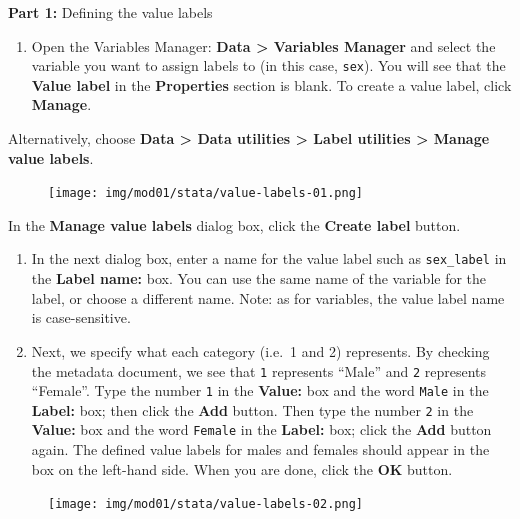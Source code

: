 \documentclass[
  a4paper,
]{memoir}
\providecommand{\tightlist}{%
  \setlength{\itemsep}{0pt}\setlength{\parskip}{0pt}}\usepackage{longtable,booktabs,array}
\begin{document}
\textbf{Part 1:} Defining the value labels

\begin{enumerate}
\def\labelenumi{\arabic{enumi}.}
\tightlist
\item
  Open the Variables Manager: \textbf{Data \textgreater{} Variables
  Manager} and select the variable you want to assign labels to (in this
  case, \texttt{sex}). You will see that the \textbf{Value label} in the
  \textbf{Properties} section is blank. To create a value label, click
  \textbf{Manage}.
\end{enumerate}

Alternatively, choose \textbf{Data \textgreater{} Data utilities
\textgreater{} Label utilities \textgreater{} Manage value labels}.

\begin{figure}[H]

{\centering \texttt{[image: img/mod01/stata/value-labels-01.png]}

}

\end{figure}

In the \textbf{Manage value labels} dialog box, click the \textbf{Create
label} button.

\begin{enumerate}
\def\labelenumi{\arabic{enumi}.}
\setcounter{enumi}{1}
\item
  In the next dialog box, enter a name for the value label such as
  \texttt{sex\_label} in the \textbf{Label name:} box. You can use the
  same name of the variable for the label, or choose a different name.
  Note: as for variables, the value label name is case-sensitive.
\item
  Next, we specify what each category (i.e.~1 and 2) represents. By
  checking the metadata document, we see that \texttt{1} represents
  ``Male'' and \texttt{2} represents ``Female''. Type the number
  \texttt{1} in the \textbf{Value:} box and the word \texttt{Male} in
  the \textbf{Label:} box; then click the \textbf{Add} button. Then type
  the number \texttt{2} in the \textbf{Value:} box and the word
  \texttt{Female} in the \textbf{Label:} box; click the \textbf{Add}
  button again. The defined value labels for males and females should
  appear in the box on the left-hand side. When you are done, click the
  \textbf{OK} button.
\end{enumerate}

\begin{figure}[H]

{\centering \texttt{[image: img/mod01/stata/value-labels-02.png]}

}

\end{figure}
\end{document}
